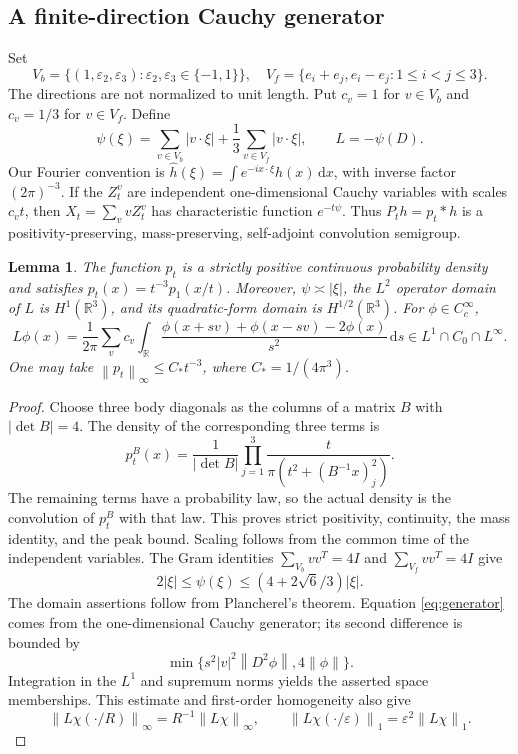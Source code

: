 \documentclass[11pt,a4paper]{article}
\newtheorem{lemma}[theorem]{Lemma}
\theoremstyle{definition}\newtheorem{definition}[theorem]{Definition}
\theoremstyle{remark}\newtheorem{remark}[theorem]{Remark}
\newcommand{\R}{\mathbb R}
\newcommand{\dd}{\,\mathrm d}
\newcommand{\norm}[1]{\left\lVert#1\right\rVert}
\newcommand{\abs}[1]{\left|#1\right|}
\begin{document}
\subsection{A finite-direction Cauchy generator}
Set
\[
 V_b=\{(1,\varepsilon_2,\varepsilon_3):\varepsilon_2,\varepsilon_3\in\{-1,1\}\},
 \quad V_f=\{e_i+e_j,e_i-e_j:1\le i<j\le3\}.
\]
The directions are not normalized to unit length. Put $c_v=1$ for $v\in V_b$ and $c_v=1/3$ for $v\in V_f$. Define
\begin{equation}\label{eq:symbol}
 \psi(\xi)=\sum_{v\in V_b}\abs{v\cdot\xi}
       +\frac13\sum_{v\in V_f}\abs{v\cdot\xi},\qquad L=-\psi(D).
\end{equation}
Our Fourier convention is $\widehat h(\xi)=\int e^{-ix\cdot\xi}h(x)\dd x$, with inverse factor $(2\pi)^{-3}$. If the $Z^v_t$ are independent one-dimensional Cauchy variables with scales $c_vt$, then $X_t=\sum_vvZ^v_t$ has characteristic function $e^{-t\psi}$. Thus $P_th=p_t*h$ is a positivity-preserving, mass-preserving, self-adjoint convolution semigroup.

\begin{lemma}\label{lem:semigroup}
The function $p_t$ is a strictly positive continuous probability density and satisfies $p_t(x)=t^{-3}p_1(x/t)$. Moreover, $\psi\asymp\abs\xi$, the $L^2$ operator domain of $L$ is $H^1(\R^3)$, and its quadratic-form domain is $H^{1/2}(\R^3)$. For $\phi\in C_c^\infty$,
\begin{equation}\label{eq:generator}
 L\phi(x)=\frac1{2\pi}\sum_vc_v\int_\R
 \frac{\phi(x+sv)+\phi(x-sv)-2\phi(x)}{s^2}\dd s
 \in L^1\cap C_0\cap L^\infty.
\end{equation}
One may take $\norm{p_t}_\infty\le C_*t^{-3}$, where $C_*=1/(4\pi^3)$.
\end{lemma}
\begin{proof}
Choose three body diagonals as the columns of a matrix $B$ with $\abs{\det B}=4$. The density of the corresponding three terms is
\[
 p_t^B(x)=\frac1{\abs{\det B}}\prod_{j=1}^3
 \frac{t}{\pi(t^2+(B^{-1}x)_j^2)}.
\]
The remaining terms have a probability law, so the actual density is the convolution of $p_t^B$ with that law. This proves strict positivity, continuity, the mass identity, and the peak bound. Scaling follows from the common time of the independent variables. The Gram identities $\sum_{V_b}vv^T=4I$ and $\sum_{V_f}vv^T=4I$ give
\[
 2\abs\xi\le\psi(\xi)\le(4+2\sqrt6/3)\abs\xi.
\]
The domain assertions follow from Plancherel's theorem. Equation \eqref{eq:generator} comes from the one-dimensional Cauchy generator; its second difference is bounded by
\[\min\{s^2\abs v^2\norm{D^2\phi},4\norm\phi\}.\]
Integration in the $L^1$ and supremum norms yields the asserted space memberships. This estimate and first-order homogeneity also give
\begin{equation}\label{eq:cutoff}
 \norm{L\chi(\cdot/R)}_\infty=R^{-1}\norm{L\chi}_\infty,
 \qquad \norm{L\chi(\cdot/\varepsilon)}_1
       =\varepsilon^2\norm{L\chi}_1.
\end{equation}
\end{proof}
\end{document}
